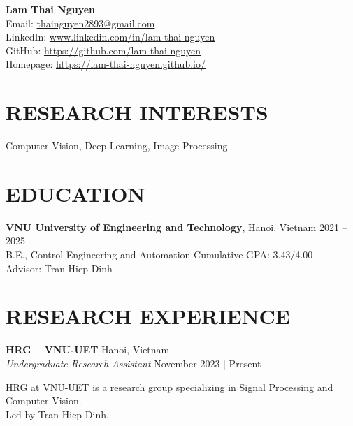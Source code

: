 \documentclass[a4paper,9pt]{extarticle}
\begin{document}
\pagestyle{fancy}
\renewcommand{\headrulewidth}{0pt}
\fancyhead{}
\fancyhead[R]{\textit{\today}}
\thispagestyle{empty} %

\begin{flushleft}
\textbf{\LARGE Lam Thai Nguyen}\\[2pt] %
Email: \href{mailto:thainguyen2893@gmail.com}{thainguyen2893@gmail.com} \\
LinkedIn: \href{https://www.linkedin.com/in/lam-thai-nguyen}{www.linkedin.com/in/lam-thai-nguyen} \\
GitHub: \href{https://github.com/lam-thai-nguyen}{https://github.com/lam-thai-nguyen}\\
Homepage: \href{https://lam-thai-nguyen.github.io/}{https://lam-thai-nguyen.github.io/}
\end{flushleft}

\section*{RESEARCH INTERESTS}
\noindent
Computer Vision, Deep Learning, Image Processing

\section*{EDUCATION}
\noindent
\textbf{VNU University of Engineering and Technology}, Hanoi, Vietnam \hfill 2021 -- 2025\\ %
B.E., Control Engineering and Automation \hfill Cumulative GPA: 3.43/4.00 \\
Advisor: Tran Hiep Dinh \\

\section*{RESEARCH EXPERIENCE}
\noindent
\textbf{HRG -- VNU-UET} \hfill Hanoi, Vietnam  \\ %
\textit{Undergraduate Research Assistant} \hfill November 2023 | Present %

\vspace{3pt}\noindent
HRG at VNU-UET is a research group specializing in Signal Processing and Computer Vision. \\ 
Led by Tran Hiep Dinh.
\end{document}
